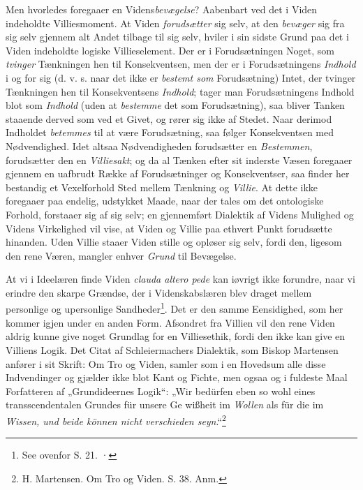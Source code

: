 \documentclass[12pt,a4paper]{book}
\newcommand{\opage}[1]{\marginnote{\footnotesize\textit{[#1]}}}
\begin{document}
Men hvorledes foregaaer en Videns\emph{bevægelse}?
Aabenbart ved det i Viden indeholdte Villiesmoment.
At Viden \emph{forudsætter} sig selv, at den \emph{bevæger} sig
fra sig selv gjennem alt Andet tilbage til sig selv, hviler
i sin sidste Grund paa det i Viden indeholdte logiske
Villieselement. Der er i Forudsætningen Noget, som
\emph{tvinger} Tænkningen hen til Konsekventsen, men der er
i Forudsætningens \emph{Indhold} i og for sig (d. v. s. naar
det ikke er \emph{bestemt som} Forudsætning) Intet, der
tvinger Tænkningen hen til Konsekventsens \emph{Indhold};
tager man Forudsætningens Indhold blot som \emph{Indhold}
(uden at \emph{bestemme} det som Forudsætning), saa
bliver Tanken staaende derved som ved et Givet, og
rører sig ikke af Stedet. Naar derimod Indholdet
\emph{be\opage{68}\setcounter{footnote}{0}temmes} til at være Forudsætning, saa følger Konsekventsen
med Nødvendighed. Idet altsaa Nødvendigheden
forudsætter en \emph{Bestemmen}, forudsætter den en
\emph{Villiesakt}; og da al Tænken efter sit inderste Væsen
foregaaer gjennem en uafbrudt Række af Forudsætninger
og Konsekventser, saa finder her bestandig et Vexelforhold
Sted mellem Tænkning og \emph{Villie}. At dette ikke foregaaer
paa endelig, udstykket Maade, naar der tales om
det ontologiske Forhold, forstaaer sig af sig selv; en
gjennemført Dialektik af Videns Mulighed og Videns
Virkelighed vil vise, at Viden og Villie paa ethvert
Punkt forudsætte hinanden. Uden Villie staaer Viden
stille og opløser sig selv, fordi den, ligesom den rene
Væren, mangler enhver \emph{Grund} til Bevægelse.

At vi i Ideelæren finde Viden \textit{clauda altero pede}
kan iøvrigt ikke forundre, naar vi erindre den skarpe
Grændse, der i Videnskabslæren blev draget mellem personlige
og upersonlige Sandheder\footnote{See ovenfor S. 21. ·}. Det er den samme
Eensidighed, som her kommer igjen under en anden
Form. Afsondret fra Villien vil den rene Viden aldrig
kunne give noget Grundlag for en Villiesethik, fordi
den ikke kan give en Villiens Logik. Det Citat af
Schleiermachers Dialektik, som Biskop Martensen anfører
i sit Skrift: Om Tro og Viden, samler som i en Hovedsum
alle disse Indvendinger og gjælder ikke blot
Kant og Fichte, men ogsaa og i fuldeste Maal Forfatteren
af „Grundideernes Logik“: „Wir bedürfen eben
so wohl eines transscendentalen Grundes für unsere Ge%
\opage{69}\setcounter{footnote}{0}%
wißheit im \emph{Wollen} als für die im \emph{Wissen, und
beide können nicht verschieden seyn}.“\footnote{H. Martensen. Om Tro og Viden. S. 38. Anm.}
\end{document}
